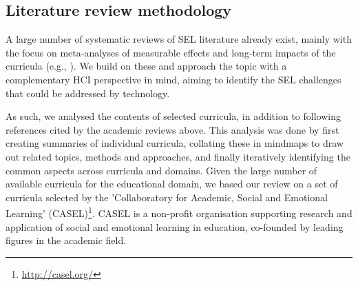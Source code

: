 \documentclass[prodmode,acmtochi]{acmsmall}
\begin{document}



        
\subsection{Literature review methodology}      
\label{sec:methodology}
A large number of systematic reviews of SEL literature already exist, mainly with the focus on meta-analyses of measurable effects and long-term impacts of the curricula (e.g., \cite{Durlak2011,Weare2011,Adi2007a,Greenberg2010,Elbertson2009,Payton2008}). 
%
We build on these and approach the topic with a complementary HCI perspective in mind, aiming to identify the SEL challenges that could be addressed by technology. %

As such, we analysed the contents of selected curricula, in addition to following references cited by the academic reviews above. This analysis was done by first creating summaries of individual curricula, collating these in mindmaps to draw out related topics, methods and approaches, and finally iteratively identifying the common aspects across curricula and domains. 
%
Given the large number of available curricula for the educational domain, we based our review on a set of curricula selected by the 'Collaboratory for Academic, Social and Emotional Learning' (CASEL)\footnote{\url{http://casel.org/}}. CASEL is a non-profit organisation supporting research and application of social and emotional learning in education, co-founded by leading figures in the academic field. 
\end{document}
